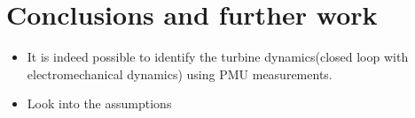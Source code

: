 \section{Conclusions and further work}
\begin{frame}{\secname}
	\begin{itemize}
		\item It is indeed possible to identify the turbine dynamics(closed loop with electromechanical dynamics) using PMU measurements.
		\item Look into the assumptions
	\end{itemize}
\end{frame}
